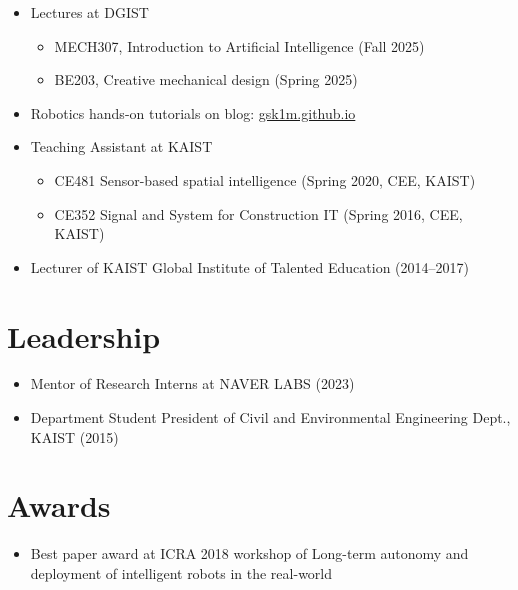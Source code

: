 \documentclass{cv} %
\begin{document}
\begin{itemize}[label=$\cdot$]
    \item Lectures at DGIST
        \begin{itemize}[label=$\cdot$]
        \item MECH307, Introduction to Artificial Intelligence (Fall 2025)
        \item BE203, Creative mechanical design (Spring 2025)
        \end{itemize}
    \item Robotics hands-on tutorials on blog: \href{https://gsk1m.github.io}{gsk1m.github.io}
        \vspace{-1mm}
    \item Teaching Assistant at KAIST
        \vspace{-1mm}
        \begin{itemize}[label=$\cdot$]
        \item CE481 Sensor-based spatial intelligence (Spring 2020, CEE, KAIST)
        \vspace{-1mm}
        \item CE352 Signal and System for Construction IT (Spring 2016, CEE, KAIST)
    \end{itemize}
        \vspace{-1mm}
    \item Lecturer of KAIST Global Institute of Talented Education (2014--2017)
\end{itemize}

\section{Leadership}
\begin{itemize}[label=$\cdot$]
\item Mentor of Research Interns at NAVER LABS (2023) 
        \vspace{-1mm}
\item Department Student President of Civil and Environmental Engineering Dept., KAIST (2015) 
\end{itemize}

\section{Awards}
\begin{itemize}[label=$\cdot$]
\item Best paper award at ICRA 2018 workshop of Long-term autonomy and deployment of intelligent robots in the real-world
\end{itemize}
\end{document}
